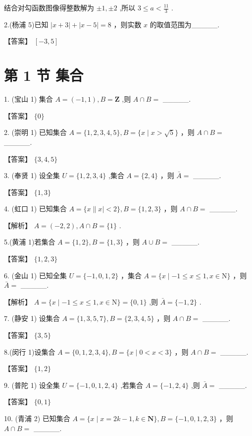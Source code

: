 \documentclass[10pt]{article}
\begin{document}
结合对勾函数图像得整数解为 \(\pm  1, \pm  2\) ,所以 \(3 \leq  a < \frac{11}{3}\) .

2.(杨浦 5)已知 \(\left| {x + 3}\right|  + \left| {x - 5}\right|  = 8\) ，则实数 \(x\) 的取值范围为\_\_\_\_\_.

【答案】 \(\left\lbrack  {-3,5}\right\rbrack\)

\section*{第 1 节 集合}

1. (宝山 1) 集合 \(A = \left( {-1,1}\right) ,B = \mathbf{Z}\) ,则 \(A \cap  B =\) \_\_\_\_\_.

【答案】 \(\{ 0\}\)

2. (崇明 1) 已知集合 \(A = \{ 1,2,3,4,5\} ,B = \{ x \mid  x > \sqrt{5}\}\) ，则 \(A \cap  B =\) \_\_\_\_\_.

【答案】 \(\{ 3,4,5\}\)

3. (奉贤 1) 设全集 \(U = \{ 1,2,3,4\}\) ,集合 \(A = \{ 2,4\}\) ，则 \(\bar{A} =\) \_\_\_\_\_.

【答案】 \(\{ 1,3\}\)

4. (虹口 1) 已知集合 \(A = \{ x\parallel x \mid   < 2\} ,B = \{ 1,2,3\}\) ，则 \(A \cap  B =\) \_\_\_\_\_.

【解析】 \(A = \left( {-2,2}\right) ,A \cap  B = \{ 1\}\) .

5.(黄浦 1)若集合 \(A = \{ 1,2\} ,B = \{ 1,3\}\) ，则 \(A \cup  B =\) \_\_\_\_\_.

【答案】 \(\{ 1,2,3\}\)

6. (金山 1) 已知全集 \(U = \{  - 1,0,1,2\}\) ，集合 \(A = \{ x \mid   - 1 \leq  x \leq  1,x \in  \mathrm{N}\}\) ，则 \(\bar{A} =\) \_\_\_\_\_.

【解析】 \(A = \{ x \mid   - 1 \leq  x \leq  1,x \in  \mathrm{N}\}  = \{ 0,1\}\) ,则 \(\bar{A} = \{  - 1,2\}\) .

7. (静安 1) 设集合 \(A = \{ 1,3,5,7\} ,B = \{ 2,3,4,5\}\) ，则 \(A \cap  B =\) \_\_\_\_\_.

【答案】 \(\{ 3,5\}\)

8.(闵行 1)设集合 \(A = \{ 0,1,2,3,4\} ,B = \{ x \mid  0 < x < 3\}\) ，则 \(A \cap  B =\) \_\_\_\_\_.

【答案】 \(\{ 1,2\}\)

9. (普陀 1) 设全集 \(U = \{  - 1,0,1,2,4\}\) ,若集合 \(A = \{  - 1,2,4\}\) ,则 \(\bar{A} =\) \_\_\_\_\_.

【答案】 \(\{ 0,1\}\)

10. (青浦 2) 已知集合 \(A = \{ x \mid  x = {2k} - 1,k \in  \mathbf{N}\} ,B = \{  - 1,0,1,2,3\}\) ，则 \(A \cap  B =\) \_\_\_\_\_.
\end{document}

